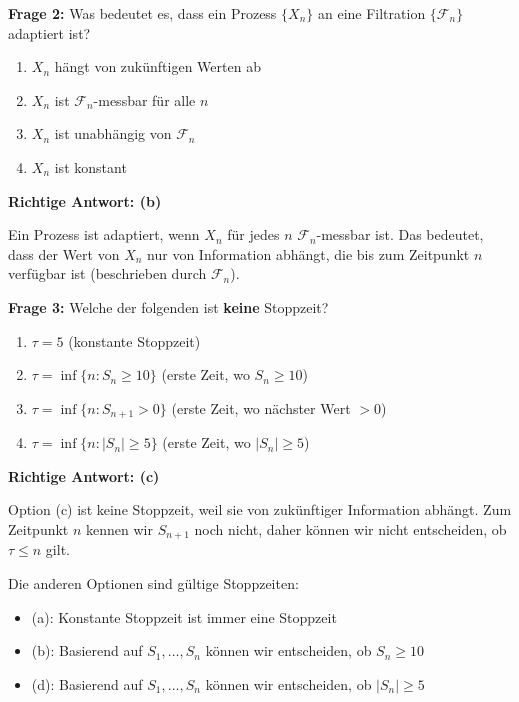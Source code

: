 \begin{multiplechoice}
\textbf{Frage 2:} Was bedeutet es, dass ein Prozess $\{X_n\}$ an eine Filtration $\{\mathcal{F}_n\}$ adaptiert ist?

\begin{enumerate}[label=(\alph*)]
    \item $X_n$ hängt von zukünftigen Werten ab
    \item $X_n$ ist $\mathcal{F}_n$-messbar für alle $n$
    \item $X_n$ ist unabhängig von $\mathcal{F}_n$
    \item $X_n$ ist konstant
\end{enumerate}

\begin{solution}
\textbf{Richtige Antwort: (b)}

Ein Prozess ist adaptiert, wenn $X_n$ für jedes $n$ $\mathcal{F}_n$-messbar ist. Das bedeutet, dass der Wert von $X_n$ nur von Information abhängt, die bis zum Zeitpunkt $n$ verfügbar ist (beschrieben durch $\mathcal{F}_n$).
\end{solution}
\end{multiplechoice}

\begin{multiplechoice}
\textbf{Frage 3:} Welche der folgenden ist \textbf{keine} Stoppzeit?

\begin{enumerate}[label=(\alph*)]
    \item $\tau = 5$ (konstante Stoppzeit)
    \item $\tau = \inf\{n : S_n \geq 10\}$ (erste Zeit, wo $S_n \geq 10$)
    \item $\tau = \inf\{n : S_{n+1} > 0\}$ (erste Zeit, wo nächster Wert $> 0$)
    \item $\tau = \inf\{n : |S_n| \geq 5\}$ (erste Zeit, wo $|S_n| \geq 5$)
\end{enumerate}

\begin{solution}
\textbf{Richtige Antwort: (c)}

Option (c) ist keine Stoppzeit, weil sie von zukünftiger Information abhängt. Zum Zeitpunkt $n$ kennen wir $S_{n+1}$ noch nicht, daher können wir nicht entscheiden, ob $\tau \leq n$ gilt.

Die anderen Optionen sind gültige Stoppzeiten:
\begin{itemize}
    \item (a): Konstante Stoppzeit ist immer eine Stoppzeit
    \item (b): Basierend auf $S_1, \ldots, S_n$ können wir entscheiden, ob $S_n \geq 10$
    \item (d): Basierend auf $S_1, \ldots, S_n$ können wir entscheiden, ob $|S_n| \geq 5$
\end{itemize}
\end{solution}
\end{multiplechoice}

